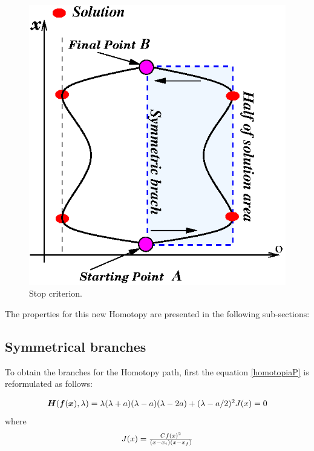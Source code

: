 \documentclass[conference,letterpaper,onecolumn]{IEEEtran}
\newcommand{\pig}[1]{\mbox{\boldmath ${#1}$}	}
\begin{document}
\begin{figure}[hbtp]
\centering
\includegraphics[scale=0.95]{figs/chap3/figs/dbh2.eps}
\caption{Stop criterion.}
\label{halftrack}
\end{figure}


The properties for this new Homotopy are presented in the following sub-sections:

\subsection{Symmetrical branches}

To obtain the branches for the Homotopy path, first the equation \ref{homotopiaP} is reformulated as follows:

\begin{equation}
{%
\begin{array}{l}
\pig{H}(\pig{f}(\pig{x}),\lambda )=\lambda(\lambda+a)(\lambda-a)(\lambda-2a)+(\lambda-a/2)^2 J(x)=0
\end{array}}
\label{homotopiaP1}
\end{equation}
where 
\begin{displaymath}
\begin{array}{l}
 J(x)= {Cf(x)^2 \over (x-x_i)(x-x_f)}
\end{array}
\end{displaymath}
\end{document}

